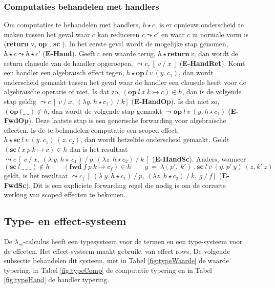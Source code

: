 \subsubsection{Computaties behandelen met handlers}
Om computaties te behandelen met handlers, $h \star c$, is er opnieuw onderscheid te maken tussen het geval waar $c$ kan reduceren $c \leadsto c'$ en waar $c$ in normale vorm is (\textbf{return} v, \textbf{op \textellipsis}, \textbf{sc \textellipsis}). In het eerste geval wordt de mogelijke stap genomen, $h \star c \leadsto h \star c'$ (\textbf{E-Hand}). Geeft $c$ een waarde terug, $h \star \textbf{return} \: v$, dan wordt de return clausule van de handler opgeroepen, $\leadsto c_{r} \:[\:v\:/\:x\:]$ (\textbf{E-HandRet}). Komt een handler een algebraïsch effect tegen, $h \star \textbf{op}\:l\:v\:(y.\:c_{1})$, dan wordt onderscheid gemaakt tussen het geval waar de handler een clausule heeft voor de algebraïsche operatie of niet. Is dat zo, $(\textbf{op}\:l\:x\:k \mapsto c) \in h$, dan is de volgende stap geldig $\leadsto c\:[\:v\:/\:x,\:(\lambda y.\:h \star c_{1}) \: / \: k]$ (\textbf{E-HandOp}). Is dat niet zo, $(\textbf{op}\:l\:\_\:\_) \notin h$, dan wordt de volgende stap gemaakt $\leadsto \textbf{op}\:l\:v\:(y.\: h \star c_{1})$ (\textbf{E-FwdOp}). Deze laatste stap is een generische forwarding voor algebraïsche effecten. Is de te behandelen computatie een scoped effect, $h \star \textbf{sc}\:l\:v\:(y.\:c_{1})\:(z.\:c_{2})$, dan wordt hetzelfde onderscheid gemaakt. Geldt $(\textbf{sc}\:l\:x\:p\:k \mapsto c) \in h$ dan is het resultaat $\leadsto c\:[\:v\:/\:x,\:(\lambda \: y. \: h \star\:c_{1}) \: / \: p, (\lambda z. \: h \star c_{2}) \:/\:k\:]$ (\textbf{E-HandSc}). Anders, wanneer $(\textbf{sc}\:l\:\_\:\_\:\_) \notin h \qquad (\textbf{fwd}\:f\:p\:k \mapsto c_{f}) \in h \qquad g\:=\:\lambda(p',\:k')\:.\:\textbf{sc}\:l\:v\:(y.\:p'\:y)\:(z.\:k'\:z)$ geldt, is het resultaat $\leadsto c_{f}\:[\:(\lambda\:y.\:h \star c_{1})\:/\:p,\:(\lambda z.\: h \star c_{2})\:/\:k,\:g\:/\:f]$ (\textbf{E-FwdSc}). Dit is een expliciete forwarding regel die nodig is om de correcte werking van scoped effecten te bekomen.

\subsection{Type- en effect-systeem}
De $\lambda_{sc}$-calculus heeft een typesysteem voor de termen en een type-systeem voor de effecten. Het effect-systeem maakt gebruikt van effect rows. De volgende subsectie behandelen dit systeem, met in Tabel \ref{fig:typeWaarde} de waarde typering, in Tabel \ref{fig:typeComp} de computatie typering en in Tabel \ref{fig:typeHand} de handler typering.
